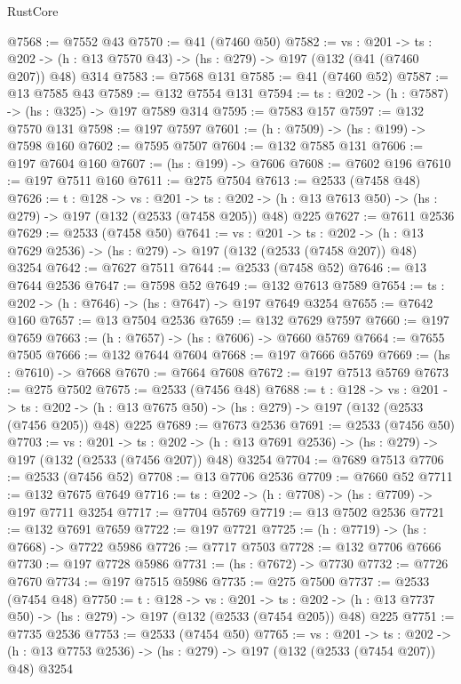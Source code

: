 \begin{lexlean}{RustCore}
\begin{coremodule}
@7568 := @7552 @43
@7570 := @41 (@7460 @50)
@7582 := {vs : @201} ->
  {ts : @202} -> (h : @13 @7570 @43) -> (hs : @279) -> @197 (@132 (@41 (@7460 @207)) @48) @314
@7583 := @7568 @131
@7585 := @41 (@7460 @52)
@7587 := @13 @7585 @43
@7589 := @132 @7554 @131
@7594 := {ts : @202} -> (h : @7587) -> (hs : @325) -> @197 @7589 @314
@7595 := @7583 @157
@7597 := @132 @7570 @131
@7598 := @197 @7597
@7601 := (h : @7509) -> (hs : @199) -> @7598 @160
@7602 := @7595 @7507
@7604 := @132 @7585 @131
@7606 := @197 @7604 @160
@7607 := (hs : @199) -> @7606
@7608 := @7602 @196
@7610 := @197 @7511 @160
@7611 := @275 @7504
@7613 := @2533 (@7458 @48)
@7626 := {t : @128} ->
  {vs : @201} ->
  {ts : @202} -> (h : @13 @7613 @50) -> (hs : @279) -> @197 (@132 (@2533 (@7458 @205)) @48) @225
@7627 := @7611 @2536
@7629 := @2533 (@7458 @50)
@7641 := {vs : @201} ->
  {ts : @202} -> (h : @13 @7629 @2536) -> (hs : @279) -> @197 (@132 (@2533 (@7458 @207)) @48) @3254
@7642 := @7627 @7511
@7644 := @2533 (@7458 @52)
@7646 := @13 @7644 @2536
@7647 := @7598 @52
@7649 := @132 @7613 @7589
@7654 := {ts : @202} -> (h : @7646) -> (hs : @7647) -> @197 @7649 @3254
@7655 := @7642 @160
@7657 := @13 @7504 @2536
@7659 := @132 @7629 @7597
@7660 := @197 @7659
@7663 := (h : @7657) -> (hs : @7606) -> @7660 @5769
@7664 := @7655 @7505
@7666 := @132 @7644 @7604
@7668 := @197 @7666 @5769
@7669 := (hs : @7610) -> @7668
@7670 := @7664 @7608
@7672 := @197 @7513 @5769
@7673 := @275 @7502
@7675 := @2533 (@7456 @48)
@7688 := {t : @128} ->
  {vs : @201} ->
  {ts : @202} -> (h : @13 @7675 @50) -> (hs : @279) -> @197 (@132 (@2533 (@7456 @205)) @48) @225
@7689 := @7673 @2536
@7691 := @2533 (@7456 @50)
@7703 := {vs : @201} ->
  {ts : @202} -> (h : @13 @7691 @2536) -> (hs : @279) -> @197 (@132 (@2533 (@7456 @207)) @48) @3254
@7704 := @7689 @7513
@7706 := @2533 (@7456 @52)
@7708 := @13 @7706 @2536
@7709 := @7660 @52
@7711 := @132 @7675 @7649
@7716 := {ts : @202} -> (h : @7708) -> (hs : @7709) -> @197 @7711 @3254
@7717 := @7704 @5769
@7719 := @13 @7502 @2536
@7721 := @132 @7691 @7659
@7722 := @197 @7721
@7725 := (h : @7719) -> (hs : @7668) -> @7722 @5986
@7726 := @7717 @7503
@7728 := @132 @7706 @7666
@7730 := @197 @7728 @5986
@7731 := (hs : @7672) -> @7730
@7732 := @7726 @7670
@7734 := @197 @7515 @5986
@7735 := @275 @7500
@7737 := @2533 (@7454 @48)
@7750 := {t : @128} ->
  {vs : @201} ->
  {ts : @202} -> (h : @13 @7737 @50) -> (hs : @279) -> @197 (@132 (@2533 (@7454 @205)) @48) @225
@7751 := @7735 @2536
@7753 := @2533 (@7454 @50)
@7765 := {vs : @201} ->
  {ts : @202} -> (h : @13 @7753 @2536) -> (hs : @279) -> @197 (@132 (@2533 (@7454 @207)) @48) @3254

\end{coremodule}
\end{lexlean}
